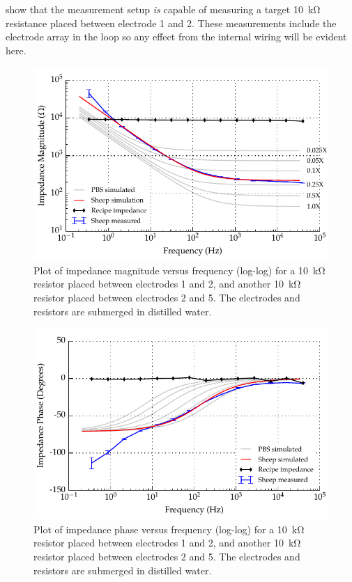  show that the measurement setup \emph{is} capable of measuring a target \SI{10}{\kilo\ohm} resistance placed between electrode 1 and 2.
These measurements include the electrode array in the loop so any effect from the internal wiring will be evident here.


\begin{figure}
    \centering
    \includegraphics[width=\textwidth]{content/appendices/Solution-Impedance-Measurements/graphics/run14_calibration_10k_water_ZVsF_graph_mag}
    \caption{\label{fig:calibration_10kRes_water_mag}Plot of impedance magnitude versus frequency (log-log) for a \SI{10}{\kilo\ohm} resistor placed between electrodes 1 and 2, and another \SI{10}{\kilo\ohm} resistor placed between electrodes 2 and 5. The electrodes and resistors are submerged in distilled water.}
\end{figure}

\begin{figure}
    \centering
    \includegraphics[width=\textwidth]{content/appendices/Solution-Impedance-Measurements/graphics/run14_calibration_10k_water_ZVsF_graph_phase}
    \caption{\label{fig:calibration_10kRes_water_phase}Plot of impedance phase versus frequency (log-log) for a \SI{10}{\kilo\ohm} resistor placed between electrodes 1 and 2, and another \SI{10}{\kilo\ohm} resistor placed between electrodes 2 and 5. The electrodes and resistors are submerged in distilled water.}
\end{figure}

